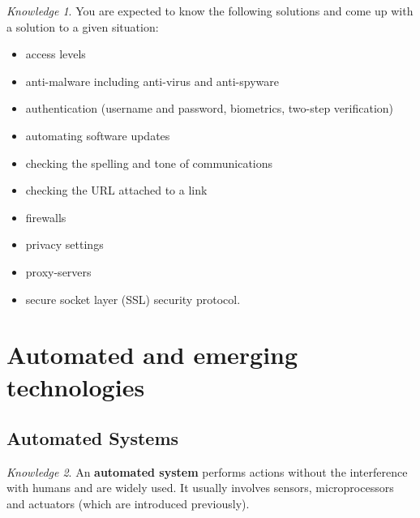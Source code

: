\documentclass[8pt]{article}
\theoremstyle{remark}
\newtheorem{knowledge}{Knowledge}[subsection]
\begin{document}
            \begin{knowledge}
                You are expected to know the following solutions and come up with a solution to a given situation:
                \begin{itemize}
                    \item access levels
                    \item anti-malware including anti-virus and anti-spyware
                    \item authentication (username and password, biometrics, two-step verification)
                    \item automating software updates
                    \item checking the spelling and tone of communications
                    \item checking the URL attached to a link
                    \item firewalls
                    \item privacy settings
                    \item proxy-servers
                    \item secure socket layer (SSL) security protocol.
                \end{itemize}
            \end{knowledge}
    \section{Automated and emerging technologies}

        \subsection{Automated Systems}
            \begin{knowledge}
                An \textbf{automated system} performs actions without the interference with humans and are widely used. It usually involves sensors, microprocessors and actuators (which are introduced previously).
            \end{knowledge}
\end{document}
